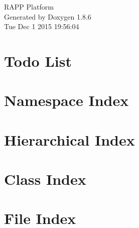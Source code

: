 \documentclass[twoside]{book}
\newcommand{\clearemptydoublepage}{%
  \newpage{\pagestyle{empty}\cleardoublepage}%
}
\begin{document}
\hypersetup{pageanchor=false}
\begin{titlepage}
\vspace*{7cm}
\begin{center}%
{\Large R\-A\-P\-P Platform }\\
\vspace*{1cm}
{\large Generated by Doxygen 1.8.6}\\
\vspace*{0.5cm}
{\small Tue Dec 1 2015 19:56:04}\\
\end{center}
\end{titlepage}
\clearemptydoublepage
\tableofcontents
\clearemptydoublepage
{}
\hypersetup{pageanchor=true}

\chapter{Todo List}
\label{todo}
\hypertarget{todo}{}

\chapter{Namespace Index}

\chapter{Hierarchical Index}

\chapter{Class Index}

\chapter{File Index}

\end{document}
